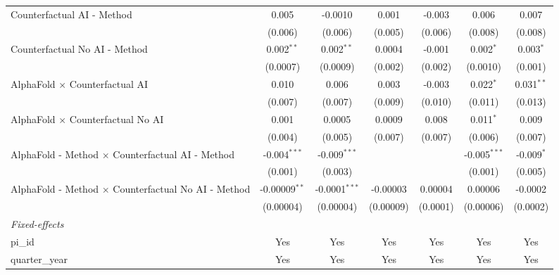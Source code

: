 \begin{tabular}{lcccccc}
   Counterfactual AI - Method                                 & 0.005           & -0.0010         & 0.001     & -0.003   & 0.006          & 0.007\\   
                                                              & (0.006)         & (0.006)         & (0.005)   & (0.006)  & (0.008)        & (0.008)\\   
   Counterfactual No AI - Method                              & 0.002$^{**}$    & 0.002$^{**}$    & 0.0004    & -0.001   & 0.002$^{*}$    & 0.003$^{*}$\\   
                                                              & (0.0007)        & (0.0009)        & (0.002)   & (0.002)  & (0.0010)       & (0.001)\\   
   AlphaFold $\times$ Counterfactual AI                       & 0.010           & 0.006           & 0.003     & -0.003   & 0.022$^{*}$    & 0.031$^{**}$\\   
                                                              & (0.007)         & (0.007)         & (0.009)   & (0.010)  & (0.011)        & (0.013)\\   
   AlphaFold $\times$ Counterfactual No AI                    & 0.001           & 0.0005          & 0.0009    & 0.008    & 0.011$^{*}$    & 0.009\\   
                                                              & (0.004)         & (0.005)         & (0.007)   & (0.007)  & (0.006)        & (0.007)\\   
   AlphaFold - Method $\times$ Counterfactual AI - Method     & -0.004$^{***}$  & -0.009$^{***}$  &           &          & -0.005$^{***}$ & -0.009$^{*}$\\   
                                                              & (0.001)         & (0.003)         &           &          & (0.001)        & (0.005)\\   
   AlphaFold - Method $\times$ Counterfactual No AI - Method  & -0.00009$^{**}$ & -0.0001$^{***}$ & -0.00003  & 0.00004  & 0.00006        & -0.0002\\   
                                                              & (0.00004)       & (0.00004)       & (0.00009) & (0.0001) & (0.00006)      & (0.0002)\\   
   \midrule
   \emph{Fixed-effects}\\
   pi\_id                                                     & Yes             & Yes             & Yes       & Yes      & Yes            & Yes\\  
   quarter\_year                                              & Yes             & Yes             & Yes       & Yes      & Yes            & Yes\\  

\end{tabular}
